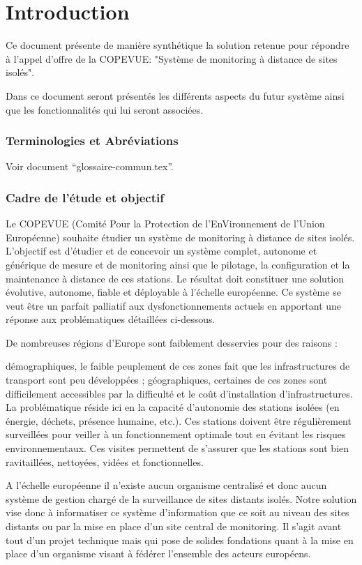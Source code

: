 \documentclass[a4paper]{article}
\begin{document}
\part{Introduction}

Ce document présente de manière synthétique la solution retenue pour répondre à l'appel d'offre de la COPEVUE: "Système de monitoring à distance de sites isolés".

Dans ce document seront présentés les différents aspects du futur système ainsi que les fonctionnalités qui lui seront associées.

\section{Terminologies et Abréviations}

Voir document ``glossaire-commun.tex''.

\section{Cadre de l’étude et objectif}

Le COPEVUE (Comité Pour la Protection de l'EnVironnement de l'Union Européenne) souhaite étudier un système de monitoring à distance de sites isolés. L'objectif est d'étudier et de concevoir un système complet, autonome et générique de mesure et de monitoring ainsi que le pilotage, la configuration et la maintenance à distance de ces stations. Le résultat doit constituer une solution évolutive, autonome, fiable et déployable à l'échelle européenne. Ce système se veut être un parfait palliatif aux dysfonctionnements actuels en apportant une réponse aux problématiques détaillées ci-dessous.

De nombreuses régions d'Europe sont faiblement desservies pour des raisons :

démographiques, le faible peuplement de ces zones fait que les infrastructures de transport sont peu développées ;
géographiques, certaines de ces zones sont difficilement accessibles par la difficulté et le coût d'installation d'infrastructures.
La problématique réside ici en la capacité d'autonomie des stations isolées (en énergie, déchets, présence humaine, etc.). Ces stations doivent être régulièrement surveillées pour veiller à un fonctionnement optimale tout en évitant les risques environnementaux. Ces visites permettent de s'assurer que les stations sont bien ravitaillées, nettoyées, vidées et fonctionnelles.

A l'échelle européenne il n'existe aucun organisme centralisé et donc aucun système de gestion chargé de la surveillance de sites distants isolés. Notre solution vise donc à informatiser ce système d'information que ce soit au niveau des sites distants ou par la mise en place d'un site central de monitoring. Il s'agit avant tout d'un projet technique mais qui pose de solides fondations quant à la mise en place d'un organisme visant à fédérer l'ensemble des acteurs européens.
\end{document}
